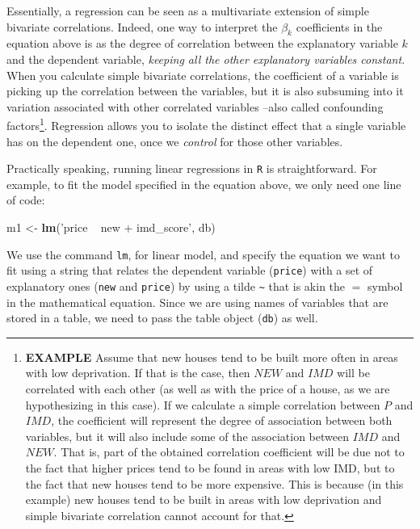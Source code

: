 \documentclass[]{book}
\newenvironment{Shaded}{\begin{snugshade}}{\end{snugshade}}
\newcommand{\KeywordTok}[1]{\textcolor[rgb]{0.13,0.29,0.53}{\textbf{#1}}}
\newcommand{\StringTok}[1]{\textcolor[rgb]{0.31,0.60,0.02}{#1}}
\newcommand{\NormalTok}[1]{#1}
\begin{document}
Essentially, a regression can be seen as a multivariate extension of
simple bivariate correlations. Indeed, one way to interpret the
\(\beta_k\) coefficients in the equation above is as the degree of
correlation between the explanatory variable \(k\) and the dependent
variable, \emph{keeping all the other explanatory variables constant}.
When you calculate simple bivariate correlations, the coefficient of a
variable is picking up the correlation between the variables, but it is
also subsuming into it variation associated with other correlated
variables --also called confounding factors\footnote{\textbf{EXAMPLE}
  Assume that new houses tend to be built more often in areas with low
  deprivation. If that is the case, then \(NEW\) and \(IMD\) will be
  correlated with each other (as well as with the price of a house, as
  we are hypothesizing in this case). If we calculate a simple
  correlation between \(P\) and \(IMD\), the coefficient will represent
  the degree of association between both variables, but it will also
  include some of the association between \(IMD\) and \(NEW\). That is,
  part of the obtained correlation coefficient will be due not to the
  fact that higher prices tend to be found in areas with low IMD, but to
  the fact that new houses tend to be more expensive. This is because
  (in this example) new houses tend to be built in areas with low
  deprivation and simple bivariate correlation cannot account for that.}.
Regression allows you to isolate the distinct effect that a single
variable has on the dependent one, once we \emph{control} for those
other variables.

Practically speaking, running linear regressions in \texttt{R} is
straightforward. For example, to fit the model specified in the equation
above, we only need one line of code:

\begin{Shaded}
\begin{Highlighting}[]
\NormalTok{m1 <-}\StringTok{ }\KeywordTok{lm}\NormalTok{(}\StringTok{'price ~ new + imd_score'}\NormalTok{, db)}
\end{Highlighting}
\end{Shaded}

We use the command \texttt{lm}, for linear model, and specify the
equation we want to fit using a string that relates the dependent
variable (\texttt{price}) with a set of explanatory ones (\texttt{new}
and \texttt{price}) by using a tilde \texttt{\textasciitilde{}} that is
akin the \(=\) symbol in the mathematical equation. Since we are using
names of variables that are stored in a table, we need to pass the table
object (\texttt{db}) as well.
\end{document}

